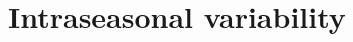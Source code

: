 \documentclass[authoryear,review,11pt]{elsarticle}
\begin{document}


\section{Intraseasonal variability}
\label{sec:intraseasonal}
\end{document}
